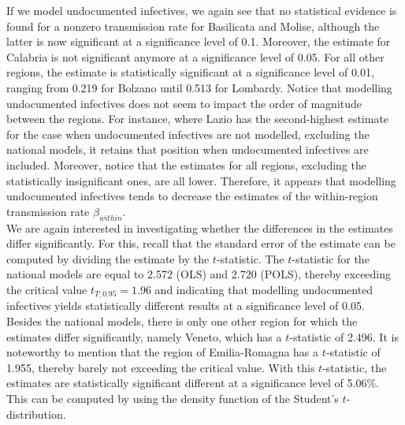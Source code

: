 \documentclass[12pt]{article}
\begin{document}
    If we model undocumented infectives, we again see that no statistical evidence is found for a nonzero transmission rate for Basilicata and Molise, although the latter is now significant at a significance level of 0.1. Moreover, the estimate for Calabria is not significant anymore at a significance level of 0.05. For all other regions, the estimate is statistically significant at a significance level of 0.01, ranging from 0.219 for Bolzano until 0.513 for Lombardy. Notice that modelling undocumented infectives does not seem to impact the order of magnitude between the regions. For instance, where Lazio has the second-highest estimate for the case when undocumented infectives are not modelled, excluding the national models, it retains that position when undocumented infectives are included. Moreover, notice that the estimates for all regions, excluding the statistically insignificant ones, are all lower. Therefore, it appears that modelling undocumented infectives tends to decrease the estimates of the within-region transmission rate $\beta_{within}$. \\

    We are again interested in investigating whether the differences in the estimates differ significantly. For this, recall that the standard error of the estimate can be computed by dividing the estimate by the $t$-statistic. The $t$-statistic for the national models are equal to 2.572 (OLS) and 2.720 (POLS), thereby exceeding the critical value $t_{T;0.95} = 1.96$ and indicating that modelling undocumented infectives yields statistically different results at a significance level of 0.05. Besides the national models, there is only one other region for which the estimates differ significantly, namely Veneto, which has a $t$-statistic of 2.496. It is noteworthy to mention that the region of Emilia-Romagna has a $t$-statistic of 1.955, thereby barely not exceeding the critical value. With this $t$-statistic, the estimates are statistically significant different at a significance level of 5.06\%. This can be computed by using the density function of the Student's $t$-distribution. \\
\end{document}
